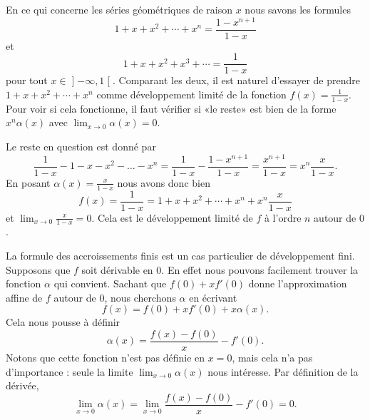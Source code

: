 \begin{example} \label{ExTHGooCBcnAy}
    En ce qui concerne les séries géométriques de raison \( x\) nous savons les formules
    \begin{equation}
        1+x+x^2+\cdots +x^n=\frac{ 1-x^{n+1} }{ 1-x }
    \end{equation}
    et
    \begin{equation}
        1+x+x^2+x^3+\cdots=\frac{ 1 }{ 1-x }
    \end{equation}
    pour tout \( x\in\mathopen] -\infty , 1 \mathclose[\). Comparant les deux, il est naturel d'essayer de prendre \( 1+x+x^2+\cdots +x^n\) comme développement limité de la fonction \( f(x)=\frac{1}{ 1-x }\). Pour voir si cela fonctionne, il faut vérifier si «le reste» est bien de la forme \( x^n\alpha(x)\) avec \( \lim_{x\to 0} \alpha(x)=0\).

    Le reste en question est donné par
    \begin{equation}
        \frac{1}{ 1-x }-1-x-x^2-\ldots-x^n=\frac{1}{ 1-x }-\frac{ 1-x^{n+1} }{ 1-x }=\frac{ x^{n+1} }{ 1-x }=x^n\frac{ x }{ 1-x }.
    \end{equation}
    En posant \( \alpha(x)=\frac{ x }{ 1-x }\) nous avons donc bien
    \begin{equation}
        f(x)=\frac{1}{ 1-x }=1+x+x^2+\cdots +x^n+x^n\frac{ x }{ 1-x }
    \end{equation}
    et \( \lim_{x\to 0} \frac{ x }{ 1-x }=0\). Cela est le développement limité de \( f\) à l'ordre \( n\) autour de \( 0\).
\end{example}

La formule des accroissements finis est un cas particulier de développement fini. Supposons que \( f\) soit dérivable en \( 0\). En effet nous pouvons facilement trouver la fonction \( \alpha\) qui convient. Sachant que \( f(0)+xf'(0)\) donne l'approximation affine de \( f\) autour de \( 0\), nous cherchons \( \alpha\) en écrivant
\begin{equation}
    f(x)=f(0)+xf'(0)+x\alpha(x).
\end{equation}
Cela nous pousse à définir
\begin{equation}    \label{EqDCFooKozKrt}
    \alpha(x)=\frac{ f(x)-f(0) }{ x }-f'(0).
\end{equation}
Notons que cette fonction n'est pas définie en \( x=0\), mais cela n'a pas d'importance : seule la limite \( \lim_{x\to 0} \alpha(x)\) nous intéresse. Par définition de la dérivée,
\begin{equation}
    \lim_{x\to 0} \alpha(x)=\lim_{x\to 0} \frac{ f(x)-f(0) }{ x }-f'(0)=0.
\end{equation}

